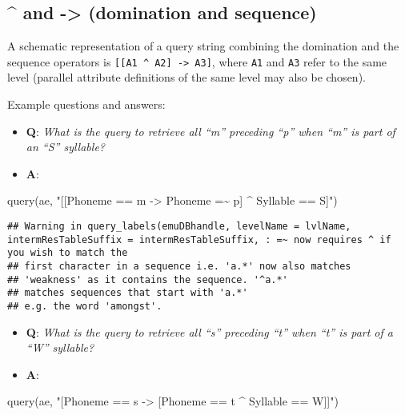 \documentclass[
]{book}
\newenvironment{Shaded}{\begin{snugshade}}{\end{snugshade}}
\newcommand{\FunctionTok}[1]{\textcolor[rgb]{0.00,0.00,0.00}{#1}}
\newcommand{\NormalTok}[1]{#1}
\newcommand{\StringTok}[1]{\textcolor[rgb]{0.31,0.60,0.02}{#1}}
\providecommand{\tightlist}{%
  \setlength{\itemsep}{0pt}\setlength{\parskip}{0pt}}
\begin{document}
\hypertarget{and---domination-and-sequence}{%
\subsection{\^{} and -\textgreater{} (domination and sequence)}\label{and---domination-and-sequence}}

A schematic representation of a query string combining the domination and the sequence operators is \texttt{{[}{[}A1\ \^{}\ A2{]}\ -\textgreater{}\ A3{]}}, where \texttt{A1} and \texttt{A3} refer to the same level (parallel attribute definitions of the same level may also be chosen).

Example questions and answers:

\begin{itemize}
\tightlist
\item
  \textbf{Q}: \emph{What is the query to retrieve all ``m'' preceding ``p'' when ``m'' is part of an ``S'' syllable?}
\item
  \textbf{A}:
\end{itemize}

\begin{Shaded}
\begin{Highlighting}[]
\FunctionTok{query}\NormalTok{(ae, }\StringTok{"[[Phoneme == m {-}\textgreater{} Phoneme =\textasciitilde{} p] \^{} Syllable == S]"}\NormalTok{)}
\end{Highlighting}
\end{Shaded}

\begin{verbatim}
## Warning in query_labels(emuDBhandle, levelName = lvlName, intermResTableSuffix = intermResTableSuffix, : =~ now requires ^ if you wish to match the
## first character in a sequence i.e. 'a.*' now also matches
## 'weakness' as it contains the sequence. '^a.*'
## matches sequences that start with 'a.*'
## e.g. the word 'amongst'.
\end{verbatim}

\begin{itemize}
\tightlist
\item
  \textbf{Q}: \emph{What is the query to retrieve all ``s'' preceding ``t'' when ``t'' is part of a ``W'' syllable?}
\item
  \textbf{A}:
\end{itemize}

\begin{Shaded}
\begin{Highlighting}[]
\FunctionTok{query}\NormalTok{(ae, }\StringTok{"[Phoneme == s {-}\textgreater{} [Phoneme == t \^{} Syllable == W]]"}\NormalTok{)}
\end{Highlighting}
\end{Shaded}
\end{document}
